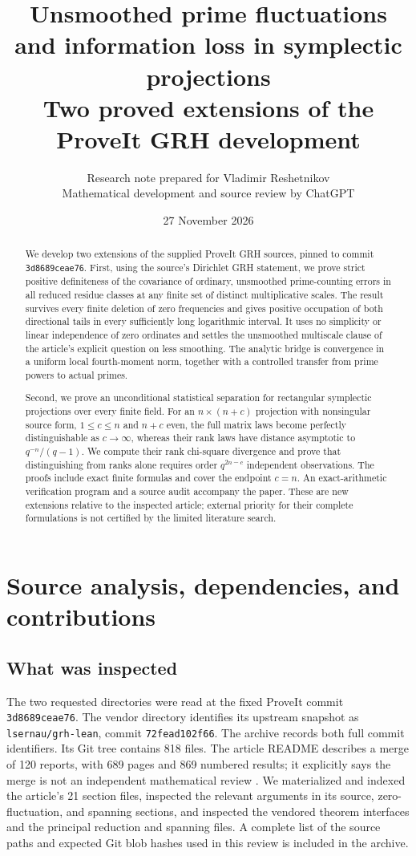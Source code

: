 \documentclass[11pt,letterpaper]{article}
\title{\textbf{Unsmoothed prime fluctuations and information loss in symplectic projections}\\[8pt]
\large Two proved extensions of the ProveIt GRH development}
\author{Research note prepared for Vladimir Reshetnikov\\\small Mathematical development and source review by ChatGPT}
\date{27 November 2026}
\numberwithin{equation}{section}
\theoremstyle{definition}
\theoremstyle{remark}
\begin{document}
\maketitle
\begin{abstract}
We develop two extensions of the supplied ProveIt GRH sources, pinned to commit
\texttt{3d8689ceae76}.
First, using the source's Dirichlet GRH statement, we prove strict positive
definiteness of the covariance of ordinary, unsmoothed prime-counting errors
in all reduced residue classes at any finite set of distinct multiplicative
scales. The result survives every finite deletion of zero frequencies and
gives positive occupation of both directional tails in every sufficiently
long logarithmic interval. It uses no simplicity or linear independence of
zero ordinates and settles the unsmoothed multiscale clause of the article's
explicit question on less smoothing. The analytic bridge is convergence in a
uniform local fourth-moment norm, together with a controlled transfer from
prime powers to actual primes.

Second, we prove an unconditional statistical separation for rectangular
symplectic projections over every finite field. For an $n\times(n+c)$
projection with nonsingular source form, $1\le c\le n$ and $n+c$ even,
the full matrix laws become perfectly distinguishable as $c\to\infty$,
whereas their rank laws have distance asymptotic to $q^{-n}/(q-1)$.
We compute their rank chi-square divergence and prove that distinguishing
from ranks alone requires order $q^{2n-c}$ independent observations.
The proofs include exact finite formulas and cover the endpoint $c=n$.
An exact-arithmetic verification program and a source audit accompany the paper.
These are new extensions relative to the inspected article; external priority
for their complete formulations is not certified by the limited literature search.
\end{abstract}
\tableofcontents
\newpage

\section{Source analysis, dependencies, and contributions}\label{sec:context}

\subsection{What was inspected}
The two requested directories were read at the fixed ProveIt commit
\texttt{3d8689ceae76}.
The vendor directory identifies its upstream snapshot as
\texttt{lsernau/grh-lean}, commit
\texttt{72fead102f66}.
The archive records both full commit identifiers. Its Git tree contains 818 files. The article README describes a merge of
120 reports, with 689 pages and 869 numbered results; it explicitly says the
merge is not an independent mathematical review \cite{ProveItArticle}.
We materialized and indexed the article's 21 section files, inspected the
relevant arguments in its source, zero-fluctuation, and spanning sections,
and inspected the vendored theorem interfaces and the principal reduction
and spanning files. A complete list of the source paths and expected Git blob
hashes used in this review is included in the archive.
\end{document}
